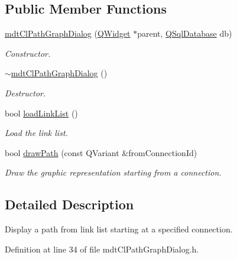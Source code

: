 \subsection*{Public Member Functions}
\begin{DoxyCompactItemize}
\item 
\hyperlink{classmdt_cl_path_graph_dialog_afcc2054a4da9c47c1ffc6de248e8a410}{mdt\-Cl\-Path\-Graph\-Dialog} (\hyperlink{class_q_widget}{Q\-Widget} $\ast$parent, \hyperlink{class_q_sql_database}{Q\-Sql\-Database} db)
\begin{DoxyCompactList}\small\item\em Constructor. \end{DoxyCompactList}\item 
\hyperlink{classmdt_cl_path_graph_dialog_a2bce7d330797ffa3d2deaa3725a72d5a}{$\sim$mdt\-Cl\-Path\-Graph\-Dialog} ()
\begin{DoxyCompactList}\small\item\em Destructor. \end{DoxyCompactList}\item 
bool \hyperlink{classmdt_cl_path_graph_dialog_a241b794bd923c18a358c675e1dbbf8bf}{load\-Link\-List} ()
\begin{DoxyCompactList}\small\item\em Load the link list. \end{DoxyCompactList}\item 
bool \hyperlink{classmdt_cl_path_graph_dialog_a0a4600a04a033c0daccac04baa626c02}{draw\-Path} (const Q\-Variant \&from\-Connection\-Id)
\begin{DoxyCompactList}\small\item\em Draw the graphic representation starting from a connection. \end{DoxyCompactList}\end{DoxyCompactItemize}


\subsection{Detailed Description}
Display a path from link list starting at a specified connection. 

Definition at line 34 of file mdt\-Cl\-Path\-Graph\-Dialog.\-h.



